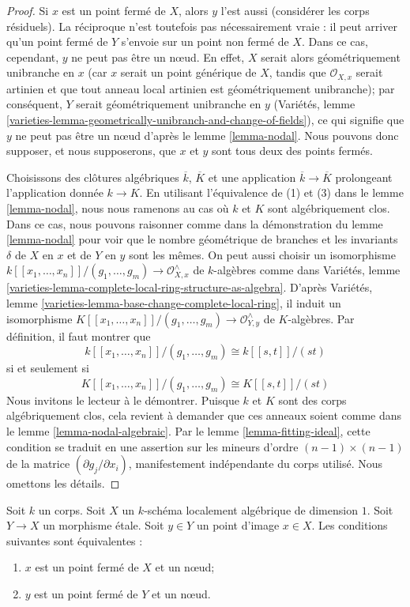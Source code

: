 \begin{proof}
Si $x$ est un point fermé de $X$, alors $y$ l'est aussi (considérer les corps résiduels). La réciproque n'est toutefois pas nécessairement vraie : il peut arriver qu'un point fermé de $Y$ s'envoie sur un point non fermé de $X$. Dans ce cas, cependant, $y$ ne peut pas être un nœud. En effet, $X$ serait alors géométriquement unibranche en $x$ (car $x$ serait un point générique de $X$, tandis que $\mathcal{O}_{X, x}$ serait artinien et que tout anneau local artinien est géométriquement unibranche); par conséquent, $Y$ serait géométriquement unibranche en $y$ (Variétés, lemme \ref{varieties-lemma-geometrically-unibranch-and-change-of-fields}), ce qui signifie que $y$ ne peut pas être un nœud d'après le lemme \ref{lemma-nodal}. Nous pouvons donc supposer, et nous supposerons, que $x$ et $y$ sont tous deux des points fermés.

\medskip\noindent
Choisissons des clôtures algébriques $\overline{k}$, $\overline{K}$ et une application $\overline{k} \to \overline{K}$ prolongeant l'application donnée $k \to K$. En utilisant l'équivalence de (1) et (3) dans le lemme \ref{lemma-nodal}, nous nous ramenons au cas où $k$ et $K$ sont algébriquement clos. Dans ce cas, nous pouvons raisonner comme dans la démonstration du lemme \ref{lemma-nodal} pour voir que le nombre géométrique de branches et les invariants $\delta$ de $X$ en $x$ et de $Y$ en $y$ sont les mêmes. On peut aussi choisir un isomorphisme $k[[x_1, \ldots, x_n]]/(g_1, \ldots, g_m) \to \mathcal{O}_{X, x}^\wedge$ de $k$-algèbres comme dans Variétés, lemme \ref{varieties-lemma-complete-local-ring-structure-as-algebra}. D'après Variétés, lemme \ref{varieties-lemma-base-change-complete-local-ring}, il induit un isomorphisme $K[[x_1, \ldots, x_n]]/(g_1, \ldots, g_m) \to \mathcal{O}_{Y, y}^\wedge$ de $K$-algèbres. Par définition, il faut montrer que $$
k[[x_1, \ldots, x_n]]/(g_1, \ldots, g_m) \cong k[[s, t]]/(st)
$$ si et seulement si $$
K[[x_1, \ldots, x_n]]/(g_1, \ldots, g_m) \cong K[[s, t]]/(st)
$$ Nous invitons le lecteur à le démontrer. Puisque $k$ et $K$ sont des corps algébriquement clos, cela revient à demander que ces anneaux soient comme dans le lemme \ref{lemma-nodal-algebraic}. Par le lemme \ref{lemma-fitting-ideal}, cette condition se traduit en une assertion sur les mineurs d'ordre $(n - 1) \times (n - 1)$ de la matrice $(\partial g_j/\partial x_i)$, manifestement indépendante du corps utilisé. Nous omettons les détails.
\end{proof}

\begin{lemma}
\label{lemma-node-etale-local}
Soit $k$ un corps. Soit $X$ un $k$-schéma localement algébrique de dimension $1$. Soit $Y \to X$ un morphisme étale. Soit $y \in Y$ un point d'image $x \in X$. Les conditions suivantes sont équivalentes : \begin{enumerate} \item $x$ est un point fermé de $X$ et un nœud; \item $y$ est un point fermé de $Y$ et un nœud.
\end{enumerate}
\end{lemma}

